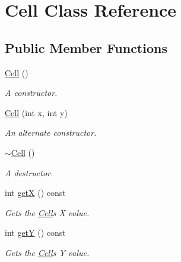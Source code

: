 \hypertarget{class_cell}{}\section{Cell Class Reference}
\label{class_cell}
\subsection*{Public Member Functions}
\begin{DoxyCompactItemize}
\item 
\mbox{\label{class_cell_a394510643e8664cf12b5efaf5cb99f71}} 
\hyperlink{class_cell_a394510643e8664cf12b5efaf5cb99f71}{Cell} ()
\begin{DoxyCompactList}\small\item\em A constructor. \end{DoxyCompactList}\item 
\hyperlink{class_cell_aa39ad04eeebb7bf00d592ad36640337e}{Cell} (int x, int y)
\begin{DoxyCompactList}\small\item\em An alternate constructor. \end{DoxyCompactList}\item 
\mbox{\label{class_cell_a9fa559f7a28e2b4336c6879ca09304d8}} 
\hyperlink{class_cell_a9fa559f7a28e2b4336c6879ca09304d8}{$\sim$\+Cell} ()
\begin{DoxyCompactList}\small\item\em A destructor. \end{DoxyCompactList}\item 
\mbox{\label{class_cell_a40caf41e5ab28c67e0e8c547eb5281ee}} 
int \hyperlink{class_cell_a40caf41e5ab28c67e0e8c547eb5281ee}{getX} () const
\begin{DoxyCompactList}\small\item\em Gets the \hyperlink{class_cell}{Cell}\textquotesingle{}s X value. \end{DoxyCompactList}\item 
\mbox{\label{class_cell_a0dc1e0edf77cb2c49840928025ef7360}} 
int \hyperlink{class_cell_a0dc1e0edf77cb2c49840928025ef7360}{getY} () const
\begin{DoxyCompactList}\small\item\em Gets the \hyperlink{class_cell}{Cell}\textquotesingle{}s Y value. \end{DoxyCompactList}\item 

\end{DoxyCompactItemize}
